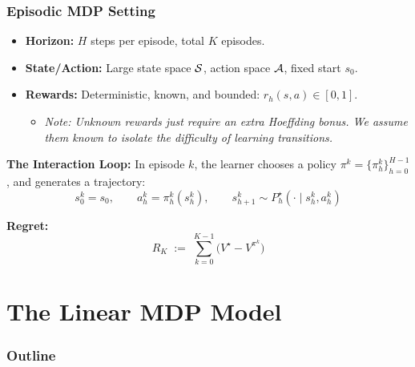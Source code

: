 \documentclass[aspectratio=169]{beamer}
\begin{document}
\begin{frame}\frametitle{Episodic MDP Setting}

\begin{itemize}
\item \textbf{Horizon:} $H$ steps per episode, total $K$ episodes.
\item \textbf{State/Action:} Large state space $\mathcal{S}$, action space $\mathcal{A}$, fixed start $s_0$.
\item \textbf{Rewards:} Deterministic, known, and bounded: $r_h(s,a) \in [0,1]$.
  \begin{itemize}
    \item \textit{Note: Unknown rewards just require an extra Hoeffding bonus. We assume them known to isolate the difficulty of learning transitions.}
  \end{itemize}
\end{itemize}

\vspace{0.4cm}
\textbf{The Interaction Loop:}
In episode $k$, the learner chooses a policy $\pi^k = \{\pi_h^k\}_{h=0}^{H-1}$, and generates a trajectory:
\[
s_0^k = s_0, \qquad a_h^k = \pi_h^k(s_h^k), \qquad s_{h+1}^k \sim P_h^\star(\cdot \mid s_h^k, a_h^k)
\]

\vspace{0.2cm}
\textbf{Regret:}
\[
R_K \;:=\; \sum_{k=0}^{K-1}\bigl(V^\star - V^{\pi^k}\bigr)
\]

\end{frame}

\section{The Linear MDP Model}
\begin{frame}[noframenumbering]
  \frametitle{Outline}
  \tableofcontents[currentsection]
\end{frame}
\end{document}
